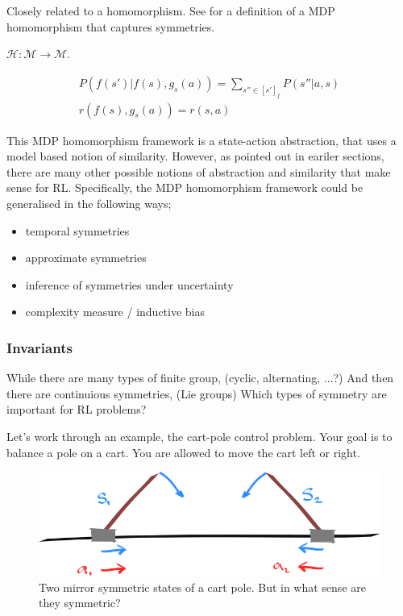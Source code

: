 Closely related to a homomorphism. See for a definition of a MDP homomorphism that captures symmetries.

\cite{Ravindran2002}

$\mathcal H: \mathcal M\to \mathcal M$.

\begin{align}
P(f(s')|f(s), g_s(a)) = \sum_{s''\in [s']_f} P(s''| a, s) \\
r(f(s), g_s(a)) = r(s, a)
\end{align}

This MDP homomorphism framework is a state-action abstraction, that uses a model based notion of similarity.
However, as pointed out in eariler sections, there are many other possible
notions of abstraction and similarity that make sense for RL. Specifically, the MDP homomorphism framework
could be generalised in the following ways;

\begin{itemize}
\tightlist
  \item temporal symmetries
  \item approximate symmetries
  \item inference of symmetries under uncertainty
  \item complexity measure / inductive bias
\end{itemize}

\subsubsection{Invariants}

While there are many types of finite group, (cyclic, alternating, ...?) And then there are continuious symmetries, (Lie groups)
Which types of symmetry are important for RL problems?

Let's work through an example, the cart-pole control problem. Your goal is to balance a pole on a cart.
You are allowed to move the cart left or right.


\begin{figure}[h!]
	\centering
	\includegraphics[width=1\textwidth,height=0.25\textheight]{../../pictures/drawings/cart-pole-mirror.png}
	\caption{Two mirror symmetric states of a cart pole. But in what sense are they symmetric?}
\end{figure}

